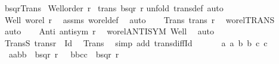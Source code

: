 \begin{isabellebody}
\endisatagproof
{\isafoldproof}%
%
\isadelimproof
\isanewline
%
\endisadelimproof
\isanewline
{}\isamarkupfalse%
\ bsqr{\isacharunderscore}{\kern0pt}Trans{\isacharcolon}{\kern0pt}\isanewline
{}\ {\isachardoublequoteopen}Well{\isacharunderscore}{\kern0pt}order\ r{\isachardoublequoteclose}\isanewline
{}\ {\isachardoublequoteopen}trans\ {\isacharparenleft}{\kern0pt}bsqr\ r{\isacharparenright}{\kern0pt}{\isachardoublequoteclose}\isanewline
%
\isadelimproof
%
\endisadelimproof
%
\isatagproof
{}\isamarkupfalse%
{\isacharparenleft}{\kern0pt}unfold\ trans{\isacharunderscore}{\kern0pt}def{\isacharcomma}{\kern0pt}\ auto{\isacharparenright}{\kern0pt}\isanewline
\ \ \isanewline
\ \ \isamarkupfalse%
\ Well{\isacharcolon}{\kern0pt}\ {\isachardoublequoteopen}wo{\isacharunderscore}{\kern0pt}rel\ r{\isachardoublequoteclose}\ \isamarkupfalse%
\ assms\ wo{\isacharunderscore}{\kern0pt}rel{\isacharunderscore}{\kern0pt}def\ \isamarkupfalse%
\ auto\isanewline
\ \ \isamarkupfalse%
\ Trans{\isacharcolon}{\kern0pt}\ {\isachardoublequoteopen}trans\ r{\isachardoublequoteclose}\ \isamarkupfalse%
\ wo{\isacharunderscore}{\kern0pt}rel{\isachardot}{\kern0pt}TRANS\ \isamarkupfalse%
\ auto\isanewline
\ \ \isamarkupfalse%
\ Anti{\isacharcolon}{\kern0pt}\ {\isachardoublequoteopen}antisym\ r{\isachardoublequoteclose}\ \isamarkupfalse%
\ wo{\isacharunderscore}{\kern0pt}rel{\isachardot}{\kern0pt}ANTISYM\ Well\ \isamarkupfalse%
\ auto\isanewline
\ \ \isamarkupfalse%
\ TransS{\isacharcolon}{\kern0pt}\ {\isachardoublequoteopen}trans{\isacharparenleft}{\kern0pt}r\ {\isacharminus}{\kern0pt}\ Id{\isacharparenright}{\kern0pt}{\isachardoublequoteclose}\ \isamarkupfalse%
\ Trans\ \isamarkupfalse%
\ {\isacharparenleft}{\kern0pt}simp\ add{\isacharcolon}{\kern0pt}\ trans{\isacharunderscore}{\kern0pt}diff{\isacharunderscore}{\kern0pt}Id{\isacharparenright}{\kern0pt}\isanewline
\ \ \isanewline
\ \ \isamarkupfalse%
\ a{}\ a{}\ b{}\ b{}\ c{}\ c{}\isanewline
\ \ \isamarkupfalse%
\ {\isacharasterisk}{\kern0pt}{\isacharcolon}{\kern0pt}\ {\isachardoublequoteopen}{\isacharparenleft}{\kern0pt}{\isacharparenleft}{\kern0pt}a{}{\isacharcomma}{\kern0pt}a{}{\isacharparenright}{\kern0pt}{\isacharcomma}{\kern0pt}{\isacharparenleft}{\kern0pt}b{}{\isacharcomma}{\kern0pt}b{}{\isacharparenright}{\kern0pt}{\isacharparenright}{\kern0pt}\ {\isasymin}\ bsqr\ r{\isachardoublequoteclose}\ \ {\isacharasterisk}{\kern0pt}{\isacharasterisk}{\kern0pt}{\isacharcolon}{\kern0pt}\ {\isachardoublequoteopen}{\isacharparenleft}{\kern0pt}{\isacharparenleft}{\kern0pt}b{}{\isacharcomma}{\kern0pt}b{}{\isacharparenright}{\kern0pt}{\isacharcomma}{\kern0pt}{\isacharparenleft}{\kern0pt}c{}{\isacharcomma}{\kern0pt}c{}{\isacharparenright}{\kern0pt}{\isacharparenright}{\kern0pt}\ {\isasymin}\ bsqr\ r{\isachardoublequoteclose}\isanewline

\end{isabellebody}
